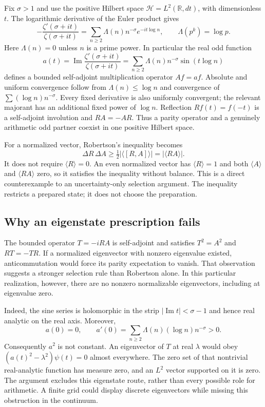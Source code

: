 \documentclass[11pt,a4paper]{article}
\begin{document}
Fix $\sigma>1$ and use the positive Hilbert space
$\mathcal H=L^2(\mathbb R,dt)$, with dimensionless $t$. The logarithmic
derivative of the Euler product gives \cite{DLMF274}
\begin{equation}
 -\frac{\zeta'(\sigma+it)}{\zeta(\sigma+it)}
 =\sum_{n\geq2}\Lambda(n)n^{-\sigma}e^{-it\log n},
 \qquad
 \Lambda(p^k)=\log p.
\end{equation}
Here $\Lambda(n)=0$ unless $n$ is a prime power. In particular the
real odd function
\begin{equation}
 a(t)=\operatorname{Im}\frac{\zeta'(\sigma+it)}{\zeta(\sigma+it)}
     =\sum_{n\geq2}\Lambda(n)n^{-\sigma}\sin(t\log n)
\end{equation}
defines a bounded self-adjoint multiplication operator $Af=af$.
Absolute and uniform convergence follow from
$\Lambda(n)\leq\log n$ and convergence of
$\sum (\log n)n^{-\sigma}$. Every fixed derivative is also uniformly
convergent; the relevant majorant has an additional fixed power of
$\log n$. Reflection $Rf(t)=f(-t)$ is a self-adjoint involution and
$RA=-AR$. Thus a parity operator and a genuinely arithmetic odd
partner coexist in one positive Hilbert space.

For a normalized vector, Robertson's inequality \cite{Robertson1929}
becomes
\begin{equation}
 \Delta R\,\Delta A\geq
 \tfrac12|\langle[R,A]\rangle|=|\langle RA\rangle|.
\end{equation}
It does not require $\langle R\rangle=0$. An even normalized vector
has $\langle R\rangle=1$ and both $\langle A\rangle$ and
$\langle RA\rangle$ zero, so it satisfies the inequality without
balance. This is a direct counterexample to an uncertainty-only
selection argument. The inequality restricts a prepared state; it
does not choose the preparation.

\subsection{Why an eigenstate prescription fails}

The bounded operator $T=-iRA$ is self-adjoint and satisfies
$T^2=A^2$ and $RT=-TR$. If a normalized eigenvector with nonzero
eigenvalue existed, anticommutation would force its parity expectation
to vanish. That observation suggests a stronger selection rule than
Robertson alone. In this particular realization, however, there are
no nonzero normalizable eigenvectors, including at eigenvalue zero.

Indeed, the sine series is holomorphic in the strip
$|\operatorname{Im}t|<\sigma-1$ and hence real analytic on the real
axis. Moreover,
\begin{equation}
 a(0)=0,\qquad
 a'(0)=\sum_{n\geq2}\Lambda(n)(\log n)n^{-\sigma}>0.
\end{equation}
Consequently $a^2$ is not constant. An eigenvector of $T$ at real
$\lambda$ would obey $(a(t)^2-\lambda^2)\psi(t)=0$ almost
everywhere. The zero set of that nontrivial real-analytic function
has measure zero, and an $L^2$ vector supported on it is zero.
The argument excludes this eigenstate route, rather than every
possible role for arithmetic. A finite grid could display discrete
eigenvectors while missing this obstruction in the continuum.
\end{document}
